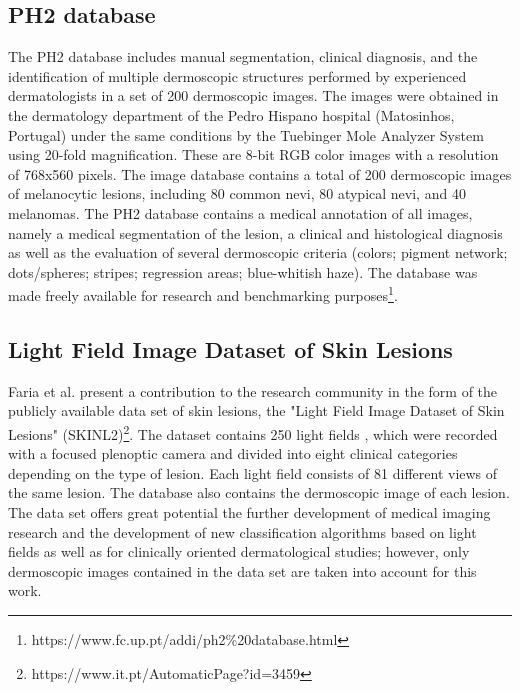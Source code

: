 \documentclass[journal]{IEEEtran}
\begin{document}
\subsection{PH2 database}
The PH2 database \cite{mendoncca2013ph} includes manual segmentation, clinical diagnosis, and the identification of multiple dermoscopic structures performed by experienced dermatologists in a set of 200 dermoscopic images. The images were obtained in the dermatology department of the Pedro Hispano hospital (Matosinhos, Portugal) under the same conditions by the Tuebinger Mole Analyzer System using 20-fold magnification. These are 8-bit RGB color images with a resolution of 768x560 pixels. The image database contains a total of 200 dermoscopic images of melanocytic lesions, including 80 common nevi, 80 atypical nevi, and 40 melanomas. The PH2 database contains a medical annotation of all images, namely a medical segmentation of the lesion, a clinical and histological diagnosis as well as the evaluation of several dermoscopic criteria (colors; pigment network; dots/spheres; stripes; regression areas; blue-whitish haze). The database was made freely available for research and benchmarking purposes\footnote{https://www.fc.up.pt/addi/ph2\%20database.html}.

\subsection{Light Field Image Dataset of Skin Lesions}
Faria et al. \cite{de2019light} present a contribution to the research community in the form of the publicly available data set of skin lesions, the "Light Field Image Dataset of Skin Lesions" (SKINL2)\footnote{https://www.it.pt/AutomaticPage?id=3459}. The dataset contains 250 light fields \cite{wu2017light}, which were recorded with a focused plenoptic camera and divided into eight clinical categories depending on the type of lesion. Each light field consists of 81 different views of the same lesion. The database also contains the dermoscopic image of each lesion. The data set offers great potential the further development of medical imaging research and the development of new classification algorithms based on light fields as well as for clinically oriented dermatological studies; however, only dermoscopic images contained in the data set are taken into account for this work.
\end{document}
